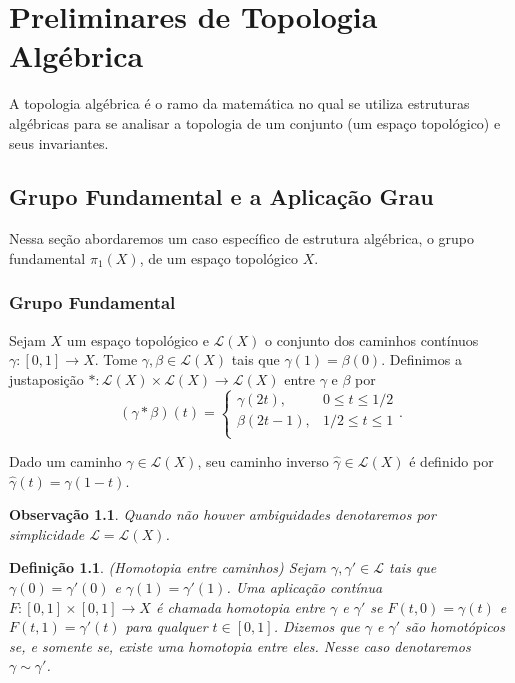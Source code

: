 \documentclass[12pt]{book}
\newtheorem{definicao}[teorema]{Definição}
\newtheorem{observacao}[teorema]{Observação}
\newcommand{\caminhos}{\mathcal{L}}
\newcommand{\caminhossempontobase}[1]{\caminhos(#1)}
\newcommand{\funcaocond}[5]{
	#1 = 
	\left\{
	\begin{array}{cc}
		#2, & #3\\
		#4, & #5\\
	\end{array}
	\right.
}
\newcommand{\grupofundamental}[1]{\pi_{1}(#1)}
\newcommand{\intervalo}{[0,1]}
\begin{document}
	
	\chapter{Preliminares de Topologia Algébrica}
	A topologia algébrica é o ramo da matemática no qual se utiliza estruturas algébricas para se analisar a topologia de um conjunto (um espaço topológico) e seus invariantes. 
	
	\section{Grupo Fundamental e a Aplicação Grau}\label{capitulo_grupo_fundamental}
	Nessa seção abordaremos um caso específico de estrutura algébrica, o grupo fundamental $\grupofundamental{X}$, de um espaço topológico $X$.
	
	\subsection{Grupo Fundamental}
	
	Sejam $X$ um espaço topológico e $\caminhossempontobase{X}$ o conjunto dos caminhos contínuos $\gamma:[0,1]\to X$. Tome $\gamma, \beta \in \caminhossempontobase{X}$ tais que $\gamma(1) = \beta(0)$. Definimos a justaposição $*:\caminhossempontobase{X}\times \caminhossempontobase{X} \to \caminhossempontobase{X}$ entre $\gamma$ e $\beta$ por
	$$
	\funcaocond{(\gamma*\beta)(t)}{\gamma(2t)}{0\leq t \leq 1/2}{\beta(2t-1)}{1/2 \leq t \leq 1}.
	$$
	
	Dado um caminho $\gamma\in \caminhossempontobase{X}$, seu caminho inverso $\hat{\gamma} \in \caminhossempontobase{X}$ é definido por $\hat{\gamma} (t) = \gamma(1-t)$.
	
	\begin{observacao}
		Quando não houver ambiguidades denotaremos por simplicidade $\caminhos=\caminhossempontobase{X}$.
	\end{observacao}
	
	\begin{definicao}\label{definicao_caminhos_homotopicos}
		(Homotopia entre caminhos) Sejam $\gamma, \gamma' \in \caminhos$ tais que $\gamma(0)=\gamma'(0)$ e $\gamma(1)=\gamma'(1)$. Uma aplicação contínua $F:\intervalo \times \intervalo \to X$ é chamada homotopia entre $\gamma$ e $\gamma'$ se $F(t, 0) = \gamma(t)$ e $F(t, 1) = \gamma'(t)$ para qualquer $t\in \intervalo$. Dizemos que  $\gamma$ e $\gamma'$ são homotópicos se, e somente se, existe uma homotopia entre eles. Nesse caso denotaremos $\gamma \sim \gamma'$. 
	\end{definicao}
	
\end{document}
